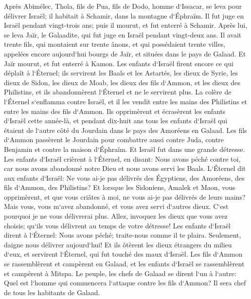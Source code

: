 \verse Après Abimélec, Thola, fils de Pua, fils de Dodo, homme d`Issacar, se leva pour délivrer Israël; il habitait à Schamir, dans la montagne d`Éphraïm. 
\verse Il fut juge en Israël pendant vingt-trois ans; puis il mourut, et fut enterré à Schamir. 
\verse Après lui, se leva Jaïr, le Galaadite, qui fut juge en Israël pendant vingt-deux ans. 
\verse Il avait trente fils, qui montaient sur trente ânons, et qui possédaient trente villes, appelées encore aujourd`hui bourgs de Jaïr, et situées dans le pays de Galaad. 
\verse Et Jaïr mourut, et fut enterré à Kamon. 
\verse Les enfants d`Israël firent encore ce qui déplaît à l`Éternel; ils servirent les Baals et les Astartés, les dieux de Syrie, les dieux de Sidon, les dieux de Moab, les dieux des fils d`Ammon, et les dieux des Philistins, et ils abandonnèrent l`Éternel et ne le servirent plus. 
\verse La colère de l`Éternel s`enflamma contre Israël, et il les vendit entre les mains des Philistins et entre les mains des fils d`Ammon. 
\verse Ils opprimèrent et écrasèrent les enfants d`Israël cette année-là, et pendant dix-huit ans tous les enfants d`Israël qui étaient de l`autre côté du Jourdain dans le pays des Amoréens en Galaad. 
\verse Les fils d`Ammon passèrent le Jourdain pour combattre aussi contre Juda, contre Benjamin et contre la maison d`Éphraïm. Et Israël fut dans une grande détresse. 
\verse Les enfants d`Israël crièrent à l`Éternel, en disant: Nous avons péché contre toi, car nous avons abandonné notre Dieu et nous avons servi les Baals. 
\verse L`Éternel dit aux enfants d`Israël: Ne vous ai-je pas délivrés des Égyptiens, des Amoréens, des fils d`Ammon, des Philistins? 
\verse Et lorsque les Sidoniens, Amalek et Maon, vous opprimèrent, et que vous criâtes à moi, ne vous ai-je pas délivrés de leurs mains? 
\verse Mais vous, vous m`avez abandonné, et vous avez servi d`autres dieux. C`est pourquoi je ne vous délivrerai plus. 
\verse Allez, invoquez les dieux que vous avez choisis; qu`ils vous délivrent au temps de votre détresse! 
\verse Les enfants d`Israël dirent à l`Éternel: Nous avons péché; traite-nous comme il te plaira. Seulement, daigne nous délivrer aujourd`hui! 
\verse Et ils ôtèrent les dieux étrangers du milieu d`eux, et servirent l`Éternel, qui fut touché des maux d`Israël. 
\verse Les fils d`Ammon se rassemblèrent et campèrent en Galaad, et les enfants d`Israël se rassemblèrent et campèrent à Mitspa. 
\verse Le peuple, les chefs de Galaad se dirent l`un à l`autre: Quel est l`homme qui commencera l`attaque contre les fils d`Ammon? Il sera chef de tous les habitants de Galaad. 

